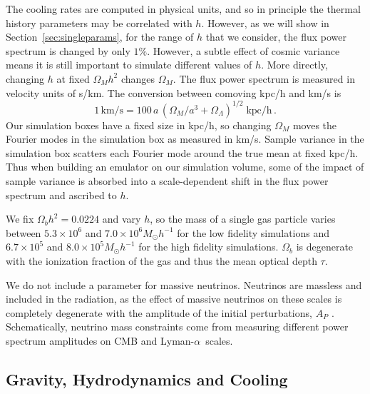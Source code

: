 \documentclass[a4paper,11pt]{article}
\newcommand{\Lya}{Lyman-$\alpha$}
\begin{document}
The cooling rates are computed in physical units, and so in principle the thermal history parameters may be correlated with $h$. However, as we will show in Section~\ref{sec:singleparams}, for the range of $h$ that we consider, the flux power spectrum is changed by only $1\%$. However, a subtle effect of cosmic variance means it is still important to simulate different values of $h$. More directly, changing $h$ at fixed $\Omega_M h^2$ changes $\Omega_M$. The flux power spectrum is measured in velocity units of s/km. The conversion between comoving kpc/h and km/s is
\begin{equation}
 1 \,\mathrm{km/s} =  100\, a \,(\Omega_M /a^3 + \Omega_\Lambda )^{1/2}\; \mathrm{kpc/h}\,.
\end{equation}
Our simulation boxes have a fixed size in kpc/h, so changing $\Omega_M$ moves the Fourier modes in the simulation box as measured in km/s. Sample variance in the simulation box scatters each Fourier mode around the true mean at fixed kpc/h. Thus when building an emulator on our simulation volume, some of the impact of sample variance is absorbed into a scale-dependent shift in the flux power spectrum and ascribed to $h$.

We fix $\Omega_b h^2 = 0.0224$ and vary $h$, so
the mass of a single gas particle varies between $5.3\times10^6$ and $7.0 \times 10^6 M_\odot h^{-1}$ for the low fidelity simulations and $6.7\times10^5$ and $8.0 \times 10^5 M_\odot h^{-1}$ for the high fidelity simulations.
$\Omega_b$ is degenerate with the ionization fraction of the gas and thus the mean optical depth $\tau$.

We do not include a parameter for massive neutrinos. Neutrinos are massless and included in the radiation, as the effect of massive neutrinos on these scales is completely degenerate with the amplitude of the initial perturbations, $A_P$ \cite{Pedersen:2020}.
Schematically, neutrino mass constraints come from measuring different power spectrum amplitudes on CMB and \Lya~scales.

\subsection{Gravity, Hydrodynamics and Cooling}
\label{sec:gravity}
\end{document}
